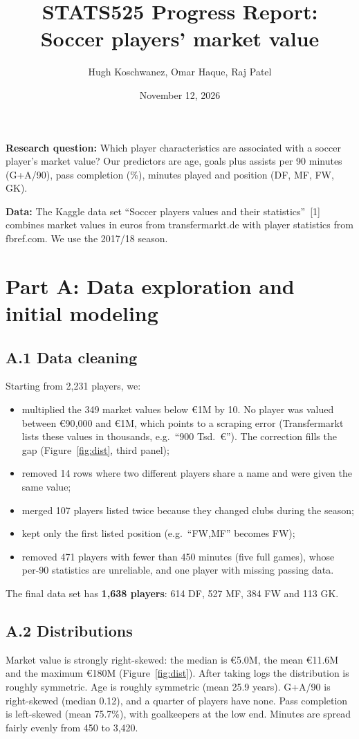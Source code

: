 \documentclass[11pt]{article}
\title{STATS525 Progress Report:\\ Soccer players' market value}
\author{Hugh Koschwanez, Omar Haque, Raj Patel}
\date{November 12, 2026}
\begin{document}
\maketitle

\textbf{Research question:} Which player characteristics are associated with a soccer player's market value? Our predictors are age, goals plus assists per 90 minutes (G+A/90), pass completion (\%), minutes played and position (DF, MF, FW, GK).

\textbf{Data:} The Kaggle data set ``Soccer players values and their statistics''~[1] combines market values in euros from transfermarkt.de with player statistics from fbref.com. We use the 2017/18 season.

\section*{Part A: Data exploration and initial modeling}

\subsection*{A.1 Data cleaning}
Starting from 2{,}231 players, we:
\begin{itemize}
    \item multiplied the 349 market values below \euro1M by 10. No player was valued between \euro90{,}000 and \euro1M, which points to a scraping error (Transfermarkt lists these values in thousands, e.g.\ ``900 Tsd.~\euro''). The correction fills the gap (Figure~\ref{fig:dist}, third panel);
    \item removed 14 rows where two different players share a name and were given the same value;
    \item merged 107 players listed twice because they changed clubs during the season;
    \item kept only the first listed position (e.g.\ ``FW,MF'' becomes FW);
    \item removed 471 players with fewer than 450 minutes (five full games), whose per-90 statistics are unreliable, and one player with missing passing data.
\end{itemize}
The final data set has \textbf{1{,}638 players}: 614 DF, 527 MF, 384 FW and 113 GK.

\subsection*{A.2 Distributions}
Market value is strongly right-skewed: the median is \euro5.0M, the mean \euro11.6M and the maximum \euro180M (Figure~\ref{fig:dist}). After taking logs the distribution is roughly symmetric. Age is roughly symmetric (mean 25.9 years). G+A/90 is right-skewed (median 0.12), and a quarter of players have none. Pass completion is left-skewed (mean 75.7\%), with goalkeepers at the low end. Minutes are spread fairly evenly from 450 to 3{,}420.
\end{document}
